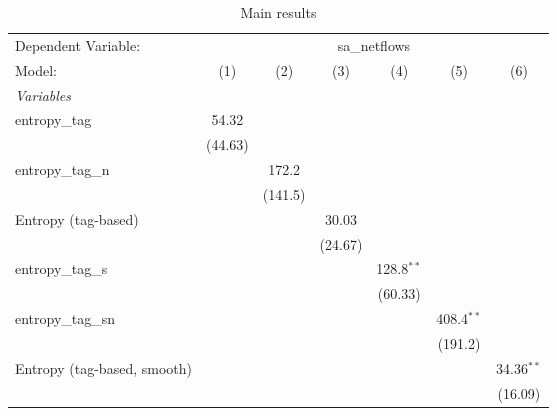 
\begin{table}[htbp]
   \centering
   \caption{\label{tab:reg_sa_netflows_tag.tex} Main results}
   \begin{footnotesize}
      \begin{tabular}{lcccccc}
         \tabularnewline\midrule\midrule
         Dependent Variable: & \multicolumn{6}{c}{sa\_netflows}\\
         Model:                      & (1)            & (2)            & (3)            & (4)            & (5)            & (6)\\
         \midrule \emph{Variables} &   &   &   &   &   &  \\
         entropy\_tag               & 54.32          &                &                &                &                &   \\
                                     & (44.63)        &                &                &                &                &   \\
         entropy\_tag\_n           &                & 172.2          &                &                &                &   \\
                                     &                & (141.5)        &                &                &                &   \\
         Entropy (tag-based)         &                &                & 30.03          &                &                &   \\
                                     &                &                & (24.67)        &                &                &   \\
         entropy\_tag\_s           &                &                &                & 128.8$^{**}$   &                &   \\
                                     &                &                &                & (60.33)        &                &   \\
         entropy\_tag\_sn          &                &                &                &                & 408.4$^{**}$   &   \\
                                     &                &                &                &                & (191.2)        &   \\
         Entropy (tag-based, smooth) &                &                &                &                &                & 34.36$^{**}$\\
                                     &                &                &                &                &                & (16.09)\\

\end{tabular}
\end{footnotesize}
\end{table}
